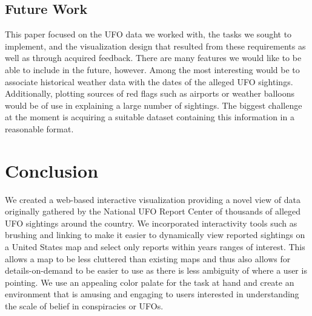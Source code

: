 \documentclass[journal]{vgtc}                %
\begin{document}
\subsection{Future Work}
This paper focused on the UFO data we worked with, the tasks we sought to implement, and the visualization design that resulted from these requirements as well as through acquired feedback. There are many features we would like to be able to include in the future, however. Among the most interesting would be to associate historical weather data with the dates of the alleged UFO sightings. Additionally, plotting sources of red flags such as airports or weather balloons would be of use in explaining a large number of sightings. The biggest challenge at the moment is acquiring a suitable dataset containing this information in a reasonable format. 


\section{Conclusion}
We created a web-based interactive visualization providing a novel view of data originally gathered by the National UFO Report Center of thousands of alleged UFO sightings around the country. We incorporated interactivity tools such as brushing and linking to make it easier to dynamically view reported sightings on a United States map and select only reports within years ranges of interest. This allows a map to be less cluttered than existing maps and thus also allows for details-on-demand to be easier to use as there is less ambiguity of where a user is pointing. We use an appealing color palate for the task at hand and create an environment that is amusing and engaging to users interested in understanding the scale of belief in conspiracies or UFOs.
\end{document}
